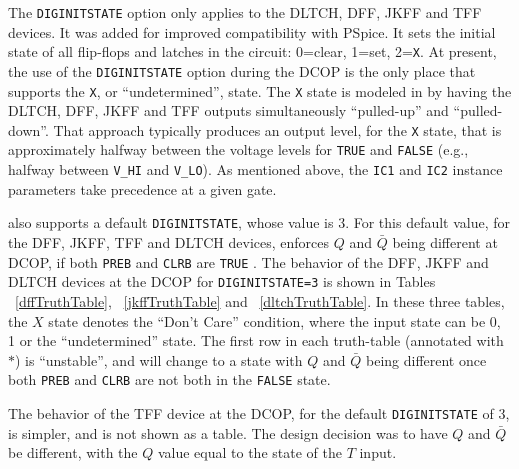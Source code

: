 The \texttt{DIGINITSTATE} option only applies to the DLTCH, DFF, JKFF and TFF devices.  It was added
for improved compatibility with PSpice.  It sets the initial state of all flip-flops and 
latches in the circuit: 0=clear, 1=set, 2=\texttt{X}.  At present, the use of the
\texttt{DIGINITSTATE} option during the DCOP is the only place that \Xyce{} supports the
\texttt{X}, or ``undetermined'', state.  The \texttt{X} state is modeled in \Xyce{} by having the
DLTCH, DFF, JKFF and TFF outputs simultaneously ``pulled-up'' and ``pulled-down''.  That approach typically 
produces an output level, for the \texttt{X} state, that is approximately halfway between the 
voltage levels for \texttt{TRUE} and \texttt{FALSE} (e.g., halfway between \texttt{V\_HI} and 
\texttt{V\_LO}). As mentioned above, the \texttt{IC1} and
\texttt{IC2} instance parameters take precedence at a given gate.

\Xyce{} also supports a default \texttt{DIGINITSTATE}, whose value is 3.  For this default value,
for the DFF, JKFF, TFF and DLTCH devices, \Xyce{} enforces $Q$ and $\bar{Q}$ being different at DCOP, if 
both \texttt{PREB} and \texttt{CLRB} are \texttt{TRUE} . The behavior of the DFF, JKFF and DLTCH 
devices at the DCOP for \texttt{DIGINITSTATE=3} is shown in Tables ~\ref{dffTruthTable},  ~\ref{jkffTruthTable}
and ~\ref{dltchTruthTable}.  In these three tables, the $X$ state denotes the ``Don't Care'' 
condition, where the input state can be 0, 1 or the ``undetermined'' state.
The first row in each truth-table (annotated with $*$) is ``unstable'', and will change to 
a state with $Q$ and $\bar{Q}$ being different once both \texttt{PREB} and \texttt{CLRB} are not 
both in the \texttt{FALSE} state.

The behavior of the TFF device at the DCOP, for the default \texttt{DIGINITSTATE} of 3, is
simpler, and is not shown as a table.  The design decision was to have $Q$ and $\bar{Q}$ be
different, with the $Q$ value equal to the state of the $T$ input.



